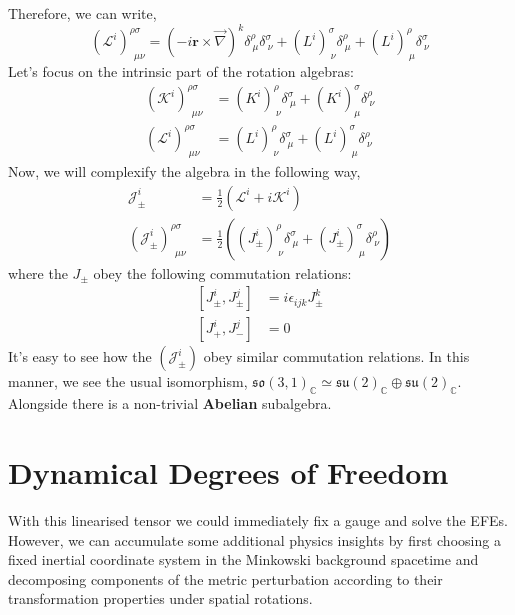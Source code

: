 Therefore, we can write, 
\begin{equation}
    \left(\mathcal{L}^i\right)^{\rho\sigma}_{\ \ \mu\nu} = (-i\mathbf{r}\times\vec{\nabla})^{k}\delta^{\rho}_{\ \mu}\delta^{\sigma}_{\ \nu} + \left(L^i\right)^{\sigma}_{\ \nu}\delta^{\rho}_{\ \mu} + \left(L^i\right)^{\rho}_{\ \mu}\delta^{\sigma}_{\ \nu}
\end{equation}
Let's focus on the intrinsic part of the rotation algebras: 
\begin{equation}
    \begin{split}
        (\mathcal{K}^i)^{\rho\sigma}_{\ \ \mu\nu} &= (K^i)^{\rho}_{\ \nu}\delta^{\sigma}_{\ \mu}+(K^i)^{\sigma}_{\mu}\delta^{\rho}_{\ \nu}\\
        (\mathcal{L}^i)^{\rho\sigma}_{\ \ \mu\nu} &= (L^i)^{\rho}_{\ \nu}\delta^{\sigma}_{\ \mu} + (L^i)^{\sigma}_{\ \mu}\delta^{\rho}_{\ \nu}
    \end{split}
\end{equation}
Now, we will complexify the algebra in the following way, 
\begin{equation}
    \begin{split}
        \mathcal{J}^i_{\pm}&=\frac{1}{2}\left(\mathcal{L}^i + i\mathcal{K}^i\right)\\
         (\mathcal{J}^i_{\pm})^{\rho\sigma}_{\ \ \mu\nu}&=\frac{1}{2}\left((J^i_{\pm})^{\rho}_{\ \nu}\delta^{\sigma}_{\ \mu} + (J^i_{\pm})^{\sigma}_{\ \mu}\delta^{\rho}_{\ \nu}\right)
    \end{split}
\end{equation}
where the $J_{\pm}$ obey the following commutation relations: 
\begin{equation}
\begin{split}
    [J^i_{\pm},J^j_{\pm}] &= i\epsilon_{ijk}J^k_{\pm}\\
    [J^i_{+}, J^j_{-}] &= 0
\end{split}
\end{equation}
It's easy to see how the $(\mathcal{J}^i_{\pm})$ obey similar commutation relations. In this manner, we see the usual isomorphism, $\mathfrak{so}(3,1)_{\mathbb{C}}\simeq \mathfrak{su}(2)_{\mathbb{C}}\oplus \mathfrak{su}(2)_{\mathbb{C}}$. Alongside there is a non-trivial \textbf{Abelian} subalgebra. 
\section{Dynamical Degrees of Freedom}
With this linearised tensor we could immediately fix a gauge and solve the EFEs. However, we can accumulate some additional physics insights by first choosing a fixed inertial coordinate system in the Minkowski background spacetime and decomposing components of the metric perturbation according to their transformation properties under spatial rotations.

